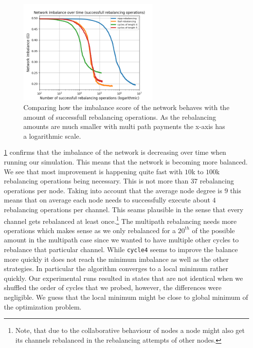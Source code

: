\documentclass[a4paper]{paper}
\begin{document}
\begin{figure}
 \centering
 \includegraphics[width=7cm]{code/vs/fig/imba_vs_steps.png}
 \caption{Comparing how the imbalance score of the network behaves with the amount of successfull rebalancing operations. As the rebalancing amounts are much smaller with multi path payments the x-axis has a logarithmic scale.}
 \label{fig:imbalancehovertime}
\end{figure}

\cref{fig:imbalancehovertime} confirms that the imbalance of the network is decreasing over time when running our simulation.
This means that the network is becoming more balanced.
We see that most improvement is happening quite fast with $10$k to $100$k rebalancing operations being necessary.
This is not more than $37$ rebalancing operations per node.
Taking into account that the average node degree is $9$ this means that on average each node needs to successfully execute about $4$ rebalancing operations per channel.  
This seams plausible in the sense that every channel gets rebalanced at least once.\footnote{Note, that due to the collaborative behaviour of nodes a node might also get its channels rebalanced in the rebalancing attempts of other nodes.}
The multipath rebalancing needs more operations which makes sense as we only rebalanced for a $20^{th}$ of the possible amount in the multipath case since we wanted to have multiple other cycles to rebalance that particular channel.
While \texttt{cycle4} seems to improve the balance more quickly it does not reach the minimum imbalance as well as the other strategies.
In particular the algorithm converges to a local minimum rather quickly.
Our experimental runs resulted in states that are not identical when we shuffled the order of cycles that we probed, however, the differences were negligible. 
We guess that the local minimum might be close to global minimum of the optimization problem.
\end{document}
